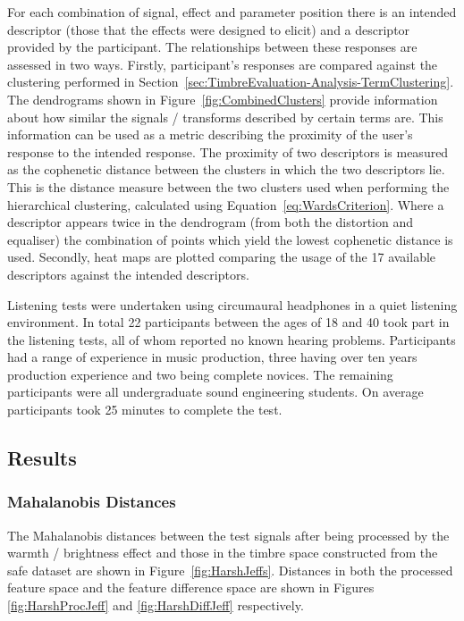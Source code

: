 			For each combination of signal, effect and parameter position there is an intended descriptor
			(those that the effects were designed to elicit) and a descriptor provided by the participant. The
			relationships between these responses are assessed in two ways. Firstly, participant's responses
			are compared against the clustering performed in
			Section~\ref{sec:TimbreEvaluation-Analysis-TermClustering}. The dendrograms shown in
			Figure~\ref{fig:CombinedClusters} provide information about how similar the signals / transforms
			described by certain terms are. This information can be used as a metric describing the proximity
			of the user's response to the intended response. The proximity of two descriptors is measured as
			the cophenetic distance between the clusters in which the two descriptors lie. This is the distance
			measure between the two clusters used when performing the hierarchical clustering, calculated using
			Equation~\ref{eq:WardsCriterion}. Where a descriptor appears twice in the dendrogram (from both the
			distortion and equaliser) the combination of points which yield the lowest cophenetic distance is
			used. Secondly, heat maps are plotted comparing the usage of the 17 available descriptors against
			the intended descriptors.

			Listening tests were undertaken using circumaural headphones in a quiet listening environment. In
			total 22 participants between the ages of 18 and 40 took part in the listening tests, all of whom
			reported no known hearing problems. Participants had a range of experience in music production,
			three having over ten years production experience and two being complete novices. The remaining
			participants were all undergraduate sound engineering students. On average participants took 25
			minutes to complete the test.

	\subsection{Results}
	\label{sec:PerceptualExperiments-SemanticControl-Results}
		\subsubsection{Mahalanobis Distances}
			The Mahalanobis distances between the test signals after being processed by the warmth / brightness
			effect and those in the timbre space constructed from the \acrshort{safe} dataset are shown in
			Figure~\ref{fig:HarshJeffs}. Distances in both the processed feature space and the feature
			difference space are shown in Figures \ref{fig:HarshProcJeff} and \ref{fig:HarshDiffJeff}
			respectively.

